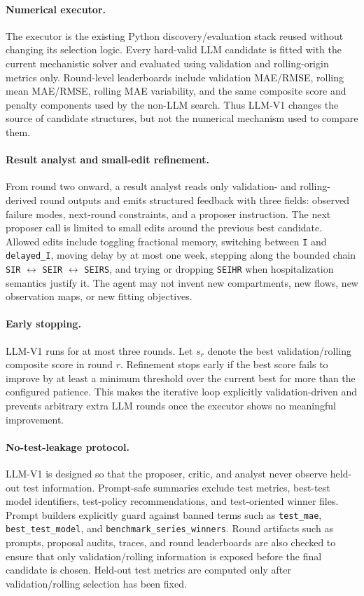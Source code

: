\paragraph{Numerical executor.}
The executor is the existing Python discovery/evaluation stack reused without
changing its selection logic. Every hard-valid LLM candidate is fitted with the
current mechanistic solver and evaluated using validation and rolling-origin
metrics only. Round-level leaderboards include validation MAE/RMSE, rolling
mean MAE/RMSE, rolling MAE variability, and the same composite score and
penalty components used by the non-LLM search. Thus LLM-V1 changes the source
of candidate structures, but not the numerical mechanism used to compare them.

\paragraph{Result analyst and small-edit refinement.}
From round two onward, a result analyst reads only validation- and
rolling-derived round outputs and emits structured feedback with three fields:
observed failure modes, next-round constraints, and a proposer instruction. The
next proposer call is limited to small edits around the previous best candidate.
Allowed edits include toggling fractional memory, switching between
\texttt{I} and \texttt{delayed\_I}, moving delay by at most one week, stepping
along the bounded chain \texttt{SIR} $\leftrightarrow$ \texttt{SEIR}
$\leftrightarrow$ \texttt{SEIRS}, and trying or dropping \texttt{SEIHR} when
hospitalization semantics justify it. The agent may not invent new compartments,
new flows, new observation maps, or new fitting objectives.

\paragraph{Early stopping.}
LLM-V1 runs for at most three rounds. Let $s_r$ denote the best
validation/rolling composite score in round $r$. Refinement stops early if the
best score fails to improve by at least a minimum threshold over the current
best for more than the configured patience. This makes the iterative loop
explicitly validation-driven and prevents arbitrary extra LLM rounds once the
executor shows no meaningful improvement.

\paragraph{No-test-leakage protocol.}
LLM-V1 is designed so that the proposer, critic, and analyst never observe
held-out test information. Prompt-safe summaries exclude test metrics, best-test
model identifiers, test-policy recommendations, and test-oriented winner files.
Prompt builders explicitly guard against banned terms such as
\texttt{test\_mae}, \texttt{best\_test\_model}, and
\texttt{benchmark\_series\_winners}. Round artifacts such as prompts, proposal
audits, traces, and round leaderboards are also checked to ensure that only
validation/rolling information is exposed before the final candidate is chosen.
Held-out test metrics are computed only after validation/rolling selection has
been fixed.

